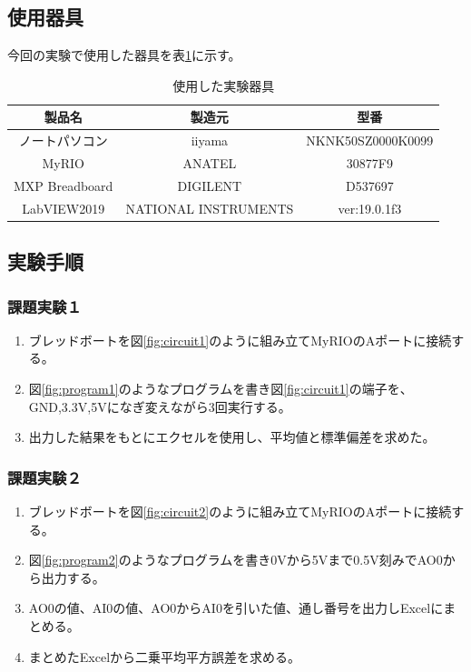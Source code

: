 \documentclass[11pt,dvipdfmx]{jarticle}
\begin{document}
\subsection{使用器具}
今回の実験で使用した器具を表\ref{tab:tools}に示す。
\begin{table}[hbtp]
	\caption{使用した実験器具}
	\label{tab:tools}
	\centering
	\begin{tabular}{|c|c|c|}
		\hline
		製品名　& 製造元　& 型番\\
		\hline \hline
		ノートパソコン & iiyama & NKNK50SZ0000K0099\\
		\hline
		MyRIO & ANATEL & 30877F9\\
		\hline
		MXP Breadboard & DIGILENT & D537697\\
		\hline
		LabVIEW2019 & NATIONAL INSTRUMENTS & ver:19.0.1f3\\
		\hline
	\end{tabular}
	
\end{table}

\subsection{実験手順}
	\subsubsection{課題実験１}
		\begin{enumerate}
			\item ブレッドボートを図\ref{fig:circuit1}のように組み立てMyRIOのAポートに接続する。
			\item 図\ref{fig:program1}のようなプログラムを書き図\ref{fig:circuit1}の端子を、GND,3.3V,5Vになぎ変えながら3回実行する。
			\item 出力した結果をもとにエクセルを使用し、平均値と標準偏差を求めた。
		\end{enumerate}

	\subsubsection{課題実験２}
		\begin{enumerate}
			\item ブレッドボートを図\ref{fig:circuit2}のように組み立てMyRIOのAポートに接続する。
			\item 図\ref{fig:program2}のようなプログラムを書き0Vから5Vまで0.5V刻みでAO0から出力する。
			\item AO0の値、AI0の値、AO0からAI0を引いた値、通し番号を出力しExcelにまとめる。
			\item まとめたExcelから二乗平均平方誤差を求める。
		\end{enumerate}
\end{document}
